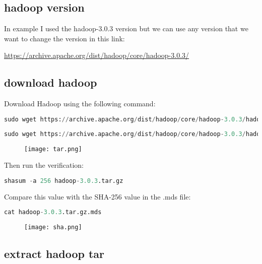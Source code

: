 \documentclass[onecolumn]{article}
\begin{document}
\subsection{hadoop version}
In example I used the hadoop-3.0.3 version but we can use any version that we want to change the version in this link:

\url{https://archive.apache.org/dist/hadoop/core/hadoop-3.0.3/} 

\subsection{download hadoop}

Download Hadoop using the following command:

\begin{lstlisting}[language=Python, caption= version check]
sudo wget https://archive.apache.org/dist/hadoop/core/hadoop-3.0.3/hadoop-3.0.3.tar.gz
\end{lstlisting}


\begin{lstlisting}[language=Python, caption= version check]
sudo wget https://archive.apache.org/dist/hadoop/core/hadoop-3.0.3/hadoop-3.0.3.tar.gz.mds
\end{lstlisting}

\begin{figure}[ht!]
\centering
\texttt{[image: tar.png]}
\caption{\label{}}
\end{figure}

Then run the verification:

\begin{lstlisting}[language=Python, caption= version check]
shasum -a 256 hadoop-3.0.3.tar.gz
\end{lstlisting}

Compare this value with the SHA-256 value in the .mds file:

\begin{lstlisting}[language=Python, caption= version check]
cat hadoop-3.0.3.tar.gz.mds
\end{lstlisting}


\begin{figure}[ht!]
\centering
\texttt{[image: sha.png]}
\caption{\label{}}
\end{figure}

\subsection{extract hadoop tar}
\end{document}
